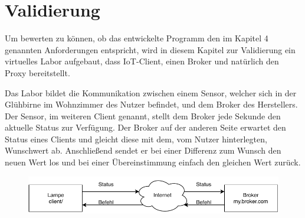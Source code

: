 \chapter{Validierung}
    
Um bewerten zu können, ob das entwickelte Programm den im Kapitel 4 genannten Anforderungen entspricht, wird in diesem Kapitel zur Validierung ein virtuelles Labor aufgebaut, dass \ac{IoT}-Client, einen Broker und natürlich den Proxy bereitstellt.

Das Labor bildet die Kommunikation zwischen einem Sensor, welcher sich in der Glühbirne im Wohnzimmer des Nutzer befindet, und dem Broker des Herstellers. Der Sensor, im weiteren Client genannt, stellt dem Broker jede Sekunde den aktuelle Status zur Verfügung. Der Broker auf der anderen Seite erwartet den Status eines Clients und gleicht diese mit dem, vom Nutzer hinterlegten, Wunschwert ab. Anschließend sendet er bei einer Differenz zum Wunsch den neuen Wert los und bei einer Übereinstimmung einfach den gleichen Wert zurück.

\begin{figure}[h]%
    \centering
    \includegraphics[width=14cm]{tex/bilder/6_validierung/Szenario.pdf}
    \label{fig:darstellung-szenario}
\end{figure}

